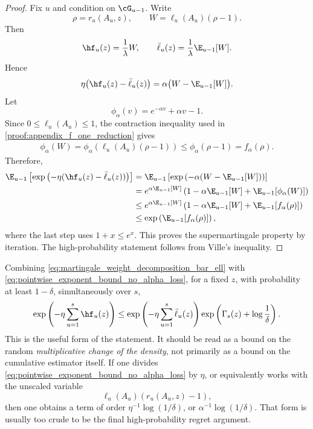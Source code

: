\begin{proof}
    Fix \(u\) and condition on \(\cG_{u-1}\). Write
    \[
        \rho=r_u(A_u,z),
        \qquad
        W=\ell_u(A_u)(\rho-1).
    \]
    Then
    \[
        \hf_u(z)=\frac{1}{\lambda}W,
        \qquad
        \bar{\ell}_u(z)=\frac{1}{\lambda}\E_{u-1}[W].
    \]
    Hence
    \[
        \eta\bigl(\hf_u(z)-\bar{\ell}_u(z)\bigr)
        =
        \alpha\bigl(W-\E_{u-1}[W]\bigr).
    \]
    Let
    \[
        \phi_\alpha(v)=e^{-\alpha v}+\alpha v-1.
    \]
    Since \(0\le \ell_u(A_u)\le1\), the contraction inequality used in
    \cref{proof:appendix_f_one_reduction} gives
    \begin{align}
        \phi_\alpha(W)
        =
        \phi_\alpha\left(\ell_u(A_u)(\rho-1)\right)
        \le
        \phi_\alpha(\rho-1)
        =
        f_\alpha(\rho).
        \label{eq:phi_contraction_for_pointwise_martingale}
    \end{align}
    Therefore,
    \begin{align}
        \E_{u-1}\left[
            \exp\left(
            -\eta(\hf_u(z)-\bar{\ell}_u(z))
            \right)
            \right]
         & =
        \E_{u-1}\left[
            \exp\left(
            -\alpha(W-\E_{u-1}[W])
            \right)
            \right]
        \\
         & =
        e^{\alpha \E_{u-1}[W]}
        \left(
        1-\alpha\E_{u-1}[W]
        +
        \E_{u-1}[\phi_\alpha(W)]
        \right)
        \\
         & \le
        e^{\alpha \E_{u-1}[W]}
        \left(
        1-\alpha\E_{u-1}[W]
        +
        \E_{u-1}[f_\alpha(\rho)]
        \right)
        \\
         & \le
        \exp\left(
        \E_{u-1}[f_\alpha(\rho)]
        \right),
    \end{align}
    where the last step uses \(1+x\le e^x\). This proves the supermartingale property by iteration.
    The high-probability statement follows from Ville's inequality.
\end{proof}

Combining \eqref{eq:martingale_weight_decomposition_bar_ell} with
\eqref{eq:pointwise_exponent_bound_no_alpha_loss}, for a fixed \(z\), with probability at least
\(1-\delta\), simultaneously over \(s\),
\begin{align}
    \exp\left(
    -\eta\sum_{u=1}^s \hf_u(z)
    \right)
    \le
    \exp\left(
    -\eta\sum_{u=1}^s \bar{\ell}_u(z)
    \right)
    \exp\left(
    \Gamma_s(z)+\log\frac1\delta
    \right).
    \label{eq:actual_weight_controlled_by_predictable_weight}
\end{align}
This is the useful form of the statement. It should be read as a bound on the random
\emph{multiplicative change of the density}, not primarily as a bound on the cumulative estimator
itself. If one divides \eqref{eq:pointwise_exponent_bound_no_alpha_loss} by \(\eta\), or equivalently
works with the unscaled variable
\[
    \ell_u(A_u)(r_u(A_u,z)-1),
\]
then one obtains a term of order \(\eta^{-1}\log(1/\delta)\), or \(\alpha^{-1}\log(1/\delta)\).
That form is usually too crude to be the final high-probability regret argument.

